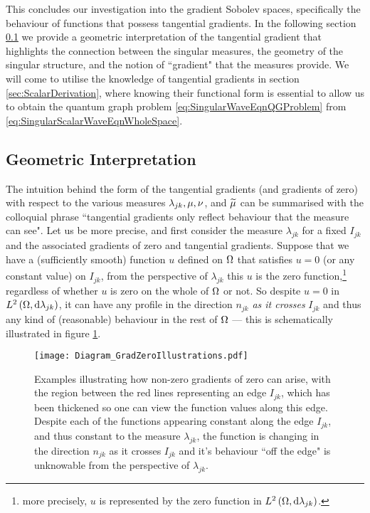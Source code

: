 This concludes our investigation into the gradient Sobolev spaces, specifically the behaviour of functions that possess tangential gradients.
In the following section \ref{ssec:3DGradGeometric} we provide a geometric interpretation of the tangential gradient that highlights the connection between the singular measures, the geometry of the singular structure, and the notion of ``gradient" that the measures provide.
We will come to utilise the knowledge of tangential gradients in section \ref{sec:ScalarDerivation}, where knowing their functional form is essential to allow us to obtain the quantum graph problem \eqref{eq:SingularWaveEqnQGProblem} from \eqref{eq:SingularScalarWaveEqnWholeSpace}.

\subsection{Geometric Interpretation} \label{ssec:3DGradGeometric}
The intuition behind the form of the tangential gradients (and gradients of zero) with respect to the various measures $\lambda_{jk}, \mu, \nu$, and $\widetilde{\mu}$ can be summarised with the colloquial phrase ``tangential gradients only reflect behaviour that the measure can see".
Let us be more precise, and first consider the measure $\lambda_{jk}$ for a fixed $I_{jk}$ and the associated gradients of zero and tangential gradients.
Suppose that we have a (sufficiently smooth) function $u$ defined on $\Omega$ that satisfies $u=0$ (or any constant value) on $I_{jk}$, from the perspective of $\lambda_{jk}$ this $u$ is the zero function,\footnote{more precisely, $u$ is represented by the zero function in $L^{2}\left( \Omega,\mathrm{d}\lambda_{jk} \right)$.} regardless of whether $u$ is zero on the whole of $\Omega$ or not.
So despite $u=0$ in $L^{2}\left( \Omega,\mathrm{d}\lambda_{jk} \right)$, it can have any profile in the direction $n_{jk}$ \emph{as it crosses} $I_{jk}$ and thus any kind of (reasonable) behaviour in the rest of $\Omega$ --- this is schematically illustrated in figure \ref{fig:Diagram_GradZeroIllustrations}.
\begin{figure}[b!]
	\centering
	\texttt{[image: Diagram\_GradZeroIllustrations.pdf]}
	\caption{\label{fig:Diagram_GradZeroIllustrations} Examples illustrating how non-zero gradients of zero can arise, with the region between the red lines representing an edge $I_{jk}$, which has been thickened so one can view the function values along this edge. Despite each of the functions appearing constant along the edge $I_{jk}$, and thus constant to the measure $\lambda_{jk}$, the function is changing in the direction $n_{jk}$ as it crosses $I_{jk}$ and it's behaviour ``off the edge" is unknowable from the perspective of $\lambda_{jk}$. }
\end{figure}
